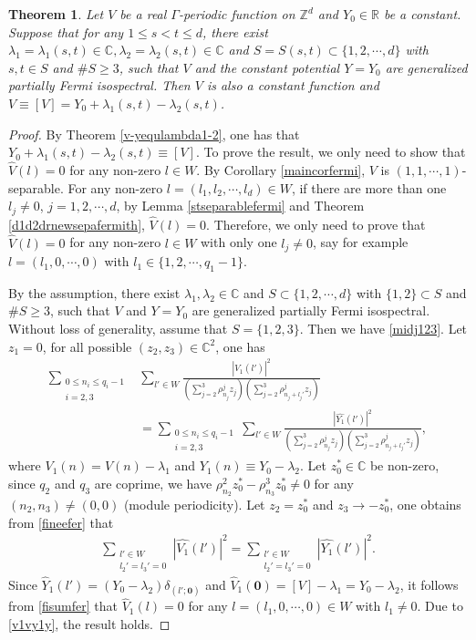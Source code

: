 \documentclass[12pt,letterpaper]{amsart}
\newtheorem{theorem}{Theorem}[section]
\newcommand{\abs}[1]{\left\lvert #1 \right\rvert}
\def\R{{\mathbb R}}
\def\C{{\mathbb C}}
\def\Z{{\mathbb Z}}
\begin{document}
\begin{theorem}
Let $V$ be a real $\Gamma$-periodic function on $\Z^d$ and $Y_0\in\R$ be a constant. Suppose that for any $1\leq s<t\leq d$, there exist $\lambda_1=\lambda_1(s,t)\in\C,\lambda_2=\lambda_2(s,t)\in\C$ and $S=S(s,t)\subset \{1,2,\cdots,d\}$ with $s,t\in S$ and $\# S\geq 3$, such that $V$ and the constant potential $Y=Y_0$ are generalized partially Fermi isospectral. Then $V$ is also a constant function and $V\equiv[V]=Y_0+\lambda_1(s,t)-\lambda_2(s,t)$.
\end{theorem}
\begin{proof}
By Theorem \ref{v-yequlambda1-2}, one has that $Y_0+\lambda_1(s,t)-\lambda_2(s,t)\equiv [V].$
To prove the result, we only need to show that $\hat{V}(l)=0$ for any non-zero $l\in W$.
By Corollary \ref{maincorfermi}, $V$ is $(1,1,\cdots,1)$-separable. For any non-zero $l=(l_1,l_2,\cdots,l_d)\in W$, if there are more than one $l_j\neq 0$, $j=1,2,\cdots,d$,
by Lemma \ref{stseparablefermi} and Theorem \ref{d1d2drnewsepafermith}, $\hat{V}(l)=0$. Therefore, we only need to prove that $\hat{V}(l)=0$ for any non-zero $l\in W$ with only one $l_j\neq 0$, say for example $l=(l_1,0,\cdots,0)$ with $l_1\in\{1,2,\cdots,q_1-1\}$.

By the assumption, there exist $\lambda_1,\lambda_2\in \C$ and $S\subset\{1,2,\cdots,d\}$ with $\{1,2\}\subset S$ and $\# S\geq 3$, such that $V$ and $Y=Y_0$ are generalized partially Fermi isospectral. Without loss of generality, assume that $S=\{1,2,3\}$. Then we have \eqref{midj123}. Let $z_1=0$, for all possible $(z_2,z_3)\in\C^2$, one has
\begin{align}
\sum_{\substack{0\leq n_i\leq q_i-1\\ i=2,3}}&\sum_{l'\in W}\frac{\abs{\hat{V_1}(l')}^2}{\left(\sum_{j=2}^3\rho^j_{n_j}z_j\right)\left(\sum_{j=2}^3\rho^j_{n_j+l_j'}z_j\right)}\nonumber\\
&=\sum_{\substack{0\leq n_i\leq q_i-1\\ i=2,3}}\sum_{l'\in W}\frac{\abs{\hat{Y_1}(l')}^2}{\left(\sum_{j=2}^3\rho^j_{n_j}z_j\right)\left(\sum_{j=2}^3\rho^j_{n_j+l_j'}z_j\right)},\label{fineefer}
\end{align}
where $V_1(n)=V(n)-\lambda_1$ and $Y_1(n)\equiv Y_0-\lambda_2$. Let $z_0^*\in\C$ be non-zero, since $q_2$ and $q_3$ are coprime, we have $\rho^2_{n_2}z_0^*-\rho^3_{n_3}z_0^*\neq0$ for any $(n_2,n_3)\neq (0,0)$ (module periodicity). Let $z_2=z_0^*$ and $z_3\to-z_0^*$, one obtains from \eqref{fineefer} that
\begin{align}
\sum_{\substack{l'\in W\\ l_2'=l_3'=0}}\abs{\hat{V_1}(l')}^2=\sum_{\substack{l'\in W\\ l_2'=l_3'=0}}\abs{\hat{Y_1}(l')}^2.\label{fisumfer}
\end{align}
Since $\hat{Y}_1(l')=(Y_0-\lambda_2)\delta_{(l';\mathbf{0})}$ and $\hat{V}_1(\mathbf{0})=[V]-\lambda_1=Y_0-\lambda_2$, it follows from \eqref{fisumfer} that $\hat{V}_1(l)=0$ for any $l=(l_1,0,\cdots,0)\in W$ with $l_1\neq 0$. Due to \eqref{v1vy1y}, the result holds.
\end{proof}
\end{document}
